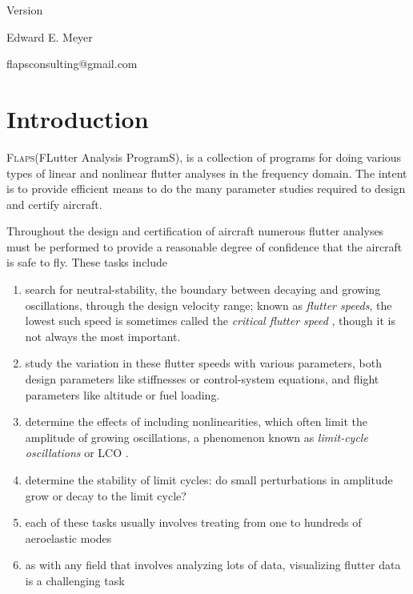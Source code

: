 \documentclass[11pt,openany,twoside]{book}
\numberwithin{equation}{section}		%
\newcommand{\Newterm}[1]{{\em #1}}	%
\newcommand{\Flaps}{\textsc{Flaps\:}}
\newcommand{\Lco}{LCO }
\begin{document}
\begin{center}
\vspace{1cm}
\large{Version }

\vspace{1cm}
\Large{Edward E. Meyer}
\par
\Large{\ttfamily flapsconsulting@gmail.com}
\end{center}

\author{Edward E. Meyer}

\tableofcontents
\listoftables
\listoffigures

\chapter{Introduction}\label{chap:intro}
\Flaps (FLutter Analysis ProgramS), is a collection of programs for doing various
types of linear and nonlinear flutter analyses in the frequency domain.
The intent is to provide efficient means to do the many parameter studies
required to design and certify aircraft.

Throughout the design and certification of aircraft numerous
flutter analyses must be performed to provide a reasonable degree
of confidence that the aircraft is safe to fly.
These tasks include
\begin{enumerate}\label{sect:tasks}
	\item search for neutral-stability,
			 the boundary between decaying and growing
			oscillations, through the design velocity range;
	      known as \Newterm{flutter speeds}, the lowest such speed
			is sometimes called the \Newterm{critical flutter speed}
			, though it is not always the most
			important.
	\item study the variation in these flutter speeds with various parameters,
	     both design parameters like stiffnesses or control-system
		  equations, and flight parameters like altitude or fuel loading.
	\item determine the effects of including nonlinearities,
			which often limit the amplitude of growing oscillations,
			a phenomenon known as \Newterm{limit-cycle oscillations} or \Lco.
	\item determine the stability of limit cycles:
	      do small perturbations in amplitude grow or decay to the limit cycle?
	\item each of these tasks usually involves treating from one to hundreds
			of aeroelastic modes
	\item as with any field that involves analyzing lots of data, visualizing
			flutter data is a challenging task
\end{enumerate}
\end{document}
